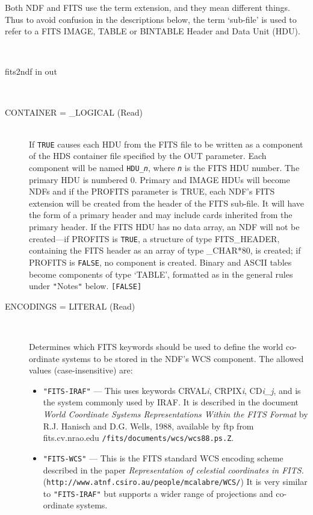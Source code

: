 \documentclass[twoside,11pt]{article}
\newcommand{\htmladdnormallink}[2]{#1}
\newcommand{\htmlref}[2]{#1}
\newcommand{\latex}[1]{#1}
\newcommand{\xref}[3]{#1}
\newcommand{\sstusage}[1]{\item[Usage:] \mbox{}
\\[1.3ex]{\raggedright \ssttt #1}}
\newcommand{\sstparameters}[1]{
   \goodbreak 
   \item[Parameters:] \mbox{} \\
   \vspace{-3.5ex}
   \begin{description}
      #1
   \end{description}
}
\newcommand{\sstsubsection}[1]{ \item[{#1}] \mbox{} \\}
\newcommand{\ssthitemlist}[1]{
  \latexonly{
  \mbox{} \\
  \vspace{-3.5ex}
  }
  \begin{itemize}
     #1
  \end{itemize}
}
\newcommand{\sstitem}{\item}
\newcommand{\sstusage}[1]{\item[\htmlref{Usage:}{app_usage}]
      \begin{description}
         {\ssttt #1}
      \end{description}
      \\
   }
\newcommand{\sstparameters}[1]{
      \item[\xref{Parameters:}{sun95}{se_param}] \\
      \begin{description}
         #1
      \end{description}
   }
\newcommand{\sstsubsection}[1]{\item[{#1}]}
\newcommand{\sstitem}{\item}
\begin{document}
{{      Both NDF and FITS use the term extension, and they mean different
      things.  Thus to avoid confusion in the descriptions below, the term
      `sub-file' is used to refer to a FITS IMAGE, TABLE or BINTABLE Header
      and Data Unit (HDU).
   }
   \sstusage{
      fits2ndf in out
   }
   \sstparameters{
      \sstsubsection{
         CONTAINER = \_LOGICAL (Read)
      }{
         If \texttt{TRUE} causes each HDU from the FITS file to be written as
         a component of the HDS container file specified by the OUT
         parameter.  Each component will be named \texttt{HDU\_\textit{n}},
         where \texttt{\textit{n}} is the FITS HDU number. The primary HDU
         is numbered 0.  Primary and IMAGE HDUs will become NDFs and if the
         PROFITS parameter is TRUE, each NDF's FITS extension will be
         created from the header of the FITS sub-file.  It will have the form
         of a primary header and may include cards inherited from the primary
         header.  If the FITS HDU has no data array, an NDF will not be
         created---if PROFITS is \texttt{TRUE}, a structure of type FITS\_HEADER,
         containing the FITS header as an array of type \_CHAR*80, is created;
         if PROFITS is \texttt{FALSE}, no component is created.
         Binary and ASCII tables become components of type `TABLE',
         formatted as in the general rules under \texttt{"}Notes\texttt{"} below.
         \texttt{[FALSE]}
      }
      \sstsubsection{
         ENCODINGS = \xref{LITERAL}{sun95}{se_parmenu} (Read)
      }{
         Determines which FITS keywords should be used to define the
         world co-ordinate systems to be stored in the NDF's WCS
         component. The allowed values (case-insensitive) are:
         \ssthitemlist{

         \sstitem 
            \texttt{"FITS-IRAF"} --- This uses keywords CRVAL\textit{i},
            CRPIX\textit{i}, CD\textit{i\_j}, and is the
            system commonly used by IRAF. It is described in the document
            \textit{World Coordinate Systems Representations Within the FITS 
            Format} by R.J. Hanisch and D.G. Wells, 1988, available by ftp 
            from fits.cv.nrao.edu \texttt{/fits/documents/wcs/wcs88.ps.Z}.

         \sstitem
            \texttt{"FITS-WCS"} --- This is the FITS standard WCS encoding 
            scheme described in the paper 
            \htmladdnormallink{\textit{Representation of celestial coordinates in FITS.}}
            {http://www.atnf.csiro.au/people/mcalabre/WCS/}\\ \latex{
            (\texttt{http://www.atnf.csiro.au/people/mcalabre/WCS/})}  It is
            very similar to \texttt{"FITS-IRAF"} but supports a wider range of
            projections and co-ordinate systems.

}}}}
\end{document}
